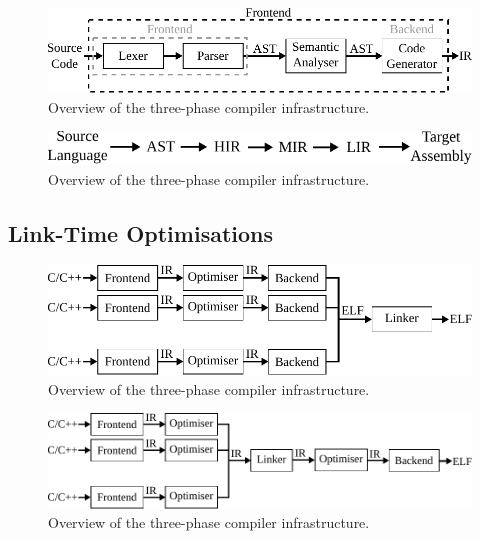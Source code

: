 \begin{figure}[h]
  \centering
  \includegraphics[scale=0.9]{src/background/figs/compiler-frontend.pdf}
  \caption{Overview of the three-phase compiler infrastructure.}
  \label{fig:compiler-frontend}
\end{figure}

\begin{figure}[h]
  \centering
  \includegraphics[scale=0.9]{src/background/figs/ir-lowering-sequence.pdf}
  \caption{Overview of the three-phase compiler infrastructure.}
  \label{fig:ir-lowering-sequence}
\end{figure}

\subsection{Link-Time Optimisations}

\begin{figure}[h]
  \centering
  \includegraphics[scale=0.85]{src/background/figs/full-pipeline.pdf}
  \caption{Overview of the three-phase compiler infrastructure.}
  \label{fig:ir-lowering-sequence}
\end{figure}

\begin{figure}[h]
  \centering
  \includegraphics[scale=0.85]{src/background/figs/full-pipeline-LTO.pdf}
  \caption{Overview of the three-phase compiler infrastructure.}
  \label{fig:ir-lowering-sequence}
\end{figure}
